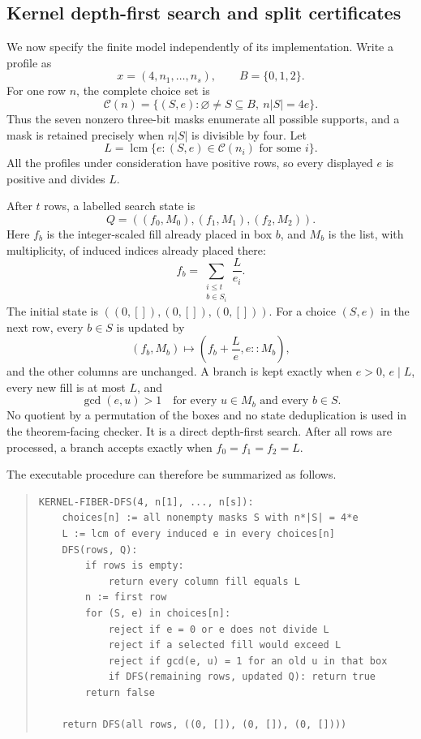 \documentclass[11pt]{article}
\theoremstyle{definition}
\begin{document}
\subsection{Kernel depth-first search and split certificates}

We now specify the finite model independently of its implementation. Write a
profile as
\[
  x=(4,n_1,\ldots,n_s),\qquad B=\{0,1,2\}.
\]
For one row $n$, the complete choice set is
\[
  \mathcal C(n)=
  \{(S,e):\varnothing\ne S\subseteq B,\ n|S|=4e\}. \tag{6.7}
\]
Thus the seven nonzero three-bit masks enumerate all possible supports, and a
mask is retained precisely when $n|S|$ is divisible by four. Let
\[
  L=\operatorname{lcm}\{e:(S,e)\in\mathcal C(n_i)
      \text{ for some }i\}. \tag{6.8}
\]
All the profiles under consideration have positive rows, so every displayed
$e$ is positive and divides $L$.

After $t$ rows, a labelled search state is
\[
  Q=((f_0,M_0),(f_1,M_1),(f_2,M_2)). \tag{6.9}
\]
Here $f_b$ is the integer-scaled fill already placed in box $b$, and $M_b$ is
the list, with multiplicity, of induced indices already placed there:
\[
  f_b=\sum_{\substack{i\leq t\\b\in S_i}}\frac{L}{e_i}.
  \tag{6.10}
\]
The initial state is $((0,[]),(0,[]),(0,[]))$. For a choice $(S,e)$ in the
next row, every $b\in S$ is updated by
\[
  (f_b,M_b)\longmapsto
  \left(f_b+\frac Le,e::M_b\right), \tag{6.11}
\]
and the other columns are unchanged. A branch is kept exactly when $e>0$,
$e\mid L$, every new fill is at most $L$, and
\[
  \gcd(e,u)>1\quad\text{for every }u\in M_b\text{ and every }b\in S.
  \tag{6.12}
\]
No quotient by a permutation of the boxes and no state deduplication is used
in the theorem-facing checker. It is a direct depth-first search. After all
rows are processed, a branch accepts exactly when $f_0=f_1=f_2=L$.

The executable procedure can therefore be summarized as follows.

\begin{quote}
\small
\begin{verbatim}
KERNEL-FIBER-DFS(4, n[1], ..., n[s]):
    choices[n] := all nonempty masks S with n*|S| = 4*e
    L := lcm of every induced e in every choices[n]
    DFS(rows, Q):
        if rows is empty:
            return every column fill equals L
        n := first row
        for (S, e) in choices[n]:
            reject if e = 0 or e does not divide L
            reject if a selected fill would exceed L
            reject if gcd(e, u) = 1 for an old u in that box
            if DFS(remaining rows, updated Q): return true
        return false

    return DFS(all rows, ((0, []), (0, []), (0, [])))
\end{verbatim}
\end{quote}
\end{document}

